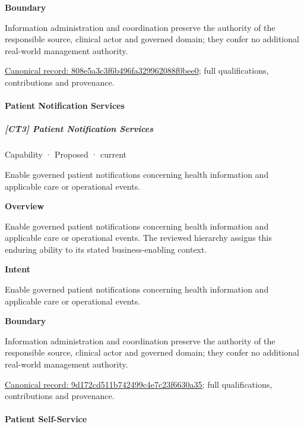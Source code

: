 \textbf{Boundary}



Information administration and coordination preserve the authority of the responsible source, clinical actor and governed domain; they confer no additional real-world management authority.


{\footnotesize \href{../../../../continuum/strategy/capability/808e5a3c3f6b496fa329962088f0bee0.md}{Canonical record: 808e5a3c3f6b496fa329962088f0bee0}; full qualifications, contributions and provenance.}\par
\paragraph{Patient Notification Services}

\subparagraph{[CT3] Patient Notification Services}

\label{element:9d172cd511b742499c4e7c23f6630a35}
{\small Capability · Proposed · current}\par

Enable governed patient notifications concerning health information and applicable care or operational events.



\textbf{Overview}



Enable governed patient notifications concerning health information and applicable care or operational events. The reviewed hierarchy assigns this enduring ability to its stated business-enabling context.



\textbf{Intent}



Enable governed patient notifications concerning health information and applicable care or operational events.



\textbf{Boundary}



Information administration and coordination preserve the authority of the responsible source, clinical actor and governed domain; they confer no additional real-world management authority.


{\footnotesize \href{../../../../continuum/strategy/capability/9d172cd511b742499c4e7c23f6630a35.md}{Canonical record: 9d172cd511b742499c4e7c23f6630a35}; full qualifications, contributions and provenance.}\par
\paragraph{Patient Self-Service}

